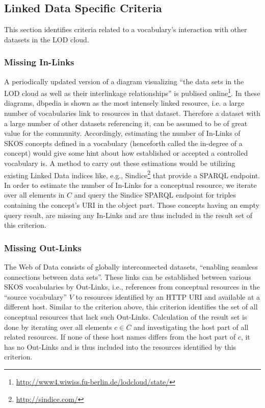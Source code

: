 
\subsection{Linked Data Specific Criteria}

This section identifies criteria related to a vocabulary's interaction with other datasets in the LOD cloud.

\subsubsection{Missing In-Links}
A periodically updated version of a diagram visualizing ``the data sets in the LOD cloud as well as their interlinkage relationships'' is publised online\footnote{\url{http://www4.wiwiss.fu-berlin.de/lodcloud/state/}}. In these diagrams, dbpedia is shown as the most intensely linked resource, i.e. a large number of vocabularies link to resources in that dataset. Therefore a dataset with a large number of other datasets referencing it, can be assumed to be of great value for the community. Accordingly, estimating the number of In-Links of SKOS concepts defined in a vocabulary (henceforth called the in-degree of a concept) would give some hint about how established or accepted a controlled vocabulary is. A method to carry out these estimations would be utilizing existing Linked Data indices like, e.g., Sindice\footnote{\url{http://sindice.com/}} that provide a SPARQL endpoint. In order to estimate the number of In-Links for a conceptual resource, we iterate over all elements in $C$ and query the Sindice SPARQL endpoint for triples containing the concept's URI in the object part. Those concepts having an empty query result, are missing any In-Links and are thus included in the result set of this criterion.

\subsubsection{Missing Out-Links}
The Web of Data consists of globally interconnected datasets, ``enabling seamless connections between data sets''\cite{Heath2011}. These links can be established between various SKOS vocabularies by Out-Links, i.e., references from conceptual resources in the ``source vocabulary'' $V$ to resources identified by an HTTP URI and available at a different host. Similar to the criterion above, this criterion identifies the set of all conceptual resources that lack such Out-Links. Calculation of the result set is done by iterating over all elements $c \in C$ and investigating the host part of all related resources. If none of these host names differs from the host part of $c$, it has no Out-Links and is thus included into the resources identified by this criterion.

